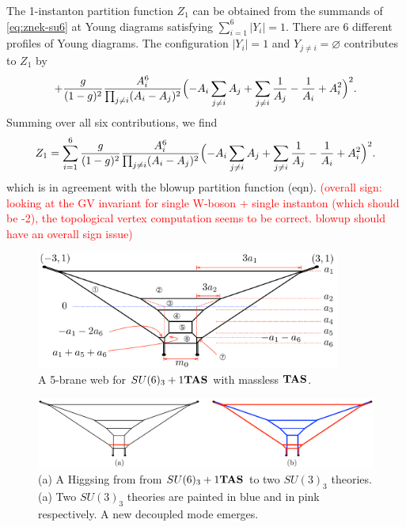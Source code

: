\documentclass[letterpaper, 11pt]{article}
\begin{document}
{The 1-instanton partition function $Z_1$ can be obtained from the summands of \eqref{eq:znek-su6} at Young diagrams satisfying $\sum_{i=1}^6 |Y_i|=1$. There are 6 different profiles of Young diagrams. The configuration $|Y_i| = 1$ and $Y_{j\neq i} = \varnothing$ contributes to $Z_{1}$ by
\begin{align}
  + \frac{g}{(1-g)^2} \frac{A_i^6}{\prod_{j \neq i} (A_i - A_j)^2} 
  \Bigl(-A_i \sum_{j\neq i} A_j +  \sum_{j\neq i}\frac{1}{A_j}  - \frac{1}{A_i} + A_i^2
 \Bigr)^2. 
\end{align}
Summing over all six contributions, we find
\begin{align}
  Z_1 = \sum_{i=1}^6 \frac{g}{(1-g)^2} \frac{A_i^6}{\prod_{j \neq i} (A_i - A_j)^2} 
  \Bigl(-A_i \sum_{j\neq i} A_j +  \sum_{j\neq i}\frac{1}{A_j}  - \frac{1}{A_i} + A_i^2
 \Bigr)^2. 
\end{align}
which is in agreement with the blowup partition function (eqn). \textcolor{red}{(overall sign: looking at the GV invariant for single W-boson + single instanton (which should be -2), the topological vertex computation seems to be correct. blowup should have an overall sign issue)}
\pagebreak

\begin{figure}[t]
\centering
\includegraphics[width=10cm]{SU6-monopole.pdf}
\caption{A 5-brane web for $SU(6)_3+1{\bf TAS}$ with massless ${\bf TAS}$.}
\label{fig:SU6-monopole}
\end{figure}

\begin{figure}[t]
\centering
\includegraphics[width=12cm]{SU6-Higgsing.pdf}
\caption{(a) A Higgsing from from $SU(6)_3+1{\bf TAS}$ to two $SU(3)_3$ theories. (a) Two $SU(3)_3$ theories are painted in blue and in pink respectively. A new decoupled mode emerges.}
\label{fig:SU6-Higgsing}
\end{figure}

}
\end{document}
